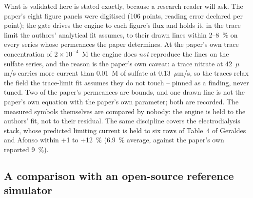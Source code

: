 \documentclass[11pt,a4paper]{article}
\begin{document}
What is validated here is stated exactly, because a research reader will
ask.  The paper's eight figure panels were digitised (106 points, reading
error declared per point); the gate drives the engine to each figure's flux
and holds it, in the trace limit the authors' analytical fit assumes, to
their drawn lines within 2--8~\% on every series whose permeances the paper
determines.  At the paper's own trace concentration of $2\times10^{-4}$~M
the engine does \emph{not} reproduce the lines on the sulfate series, and
the reason is the paper's own caveat: a trace nitrate at 42~$\mu$m/s carries
more current than 0.01~M of sulfate at 0.13~$\mu$m/s, so the traces relax
the field the trace-limit fit assumes they do not touch -- pinned as a
finding, never tuned.  Two of the paper's permeances are bounds, and one
drawn line is not the paper's own equation with the paper's own parameter;
both are recorded.  The measured symbols themselves are compared by nobody:
the engine is held to the authors' fit, not to their residual.  The same
discipline covers the electrodialysis stack, whose predicted limiting
current is held to six rows of Table~4 of Geraldes and Afonso
\citep{geraldes2010} within +1 to +12~\% (6.9~\% average, against the
paper's own reported 9~\%).

\subsection{A comparison with an open-source reference simulator}
\label{sec:ex-comparison}
\end{document}
